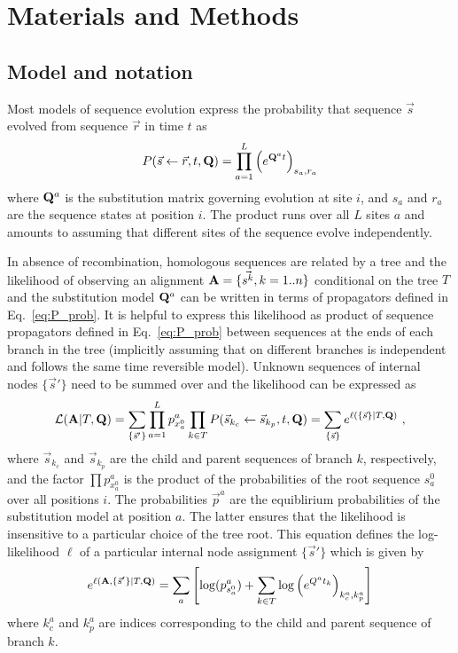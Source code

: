 \documentclass[aps,rmp,twocolumn]{revtex4}
\newcommand{\bq}{\begin{equation}}
\newcommand{\eq}{\end{equation}}
\newcommand{\mat}[1]{{\bf #1}}
\newcommand{\eqp}{p}
\newcommand{\LH}{\mathcal{L}}
\newcommand{\lh}{\ell}
\begin{document}


\onecolumngrid

\section*{Materials and Methods}
\subsection*{Model and notation}
\label{sec:MM_model}
Most models of sequence evolution express the probability that sequence $\vec{s}$ evolved from sequence $\vec{r}$ in time $t$ as
\bq
P(\vec{s}\leftarrow \vec{r},t,\mat{Q}) = \prod_{a=1}^L \left(e^{\mat{Q}^{a} t}\right)_{s_{a},r_{a}}
\label{eq:P_prob}
\eq
where $\mat{Q}^{a}$ is the substitution matrix governing evolution at site $i$, and $s_{a}$ and $r_{a}$ are the sequence states at position $i$.
The product runs over all $L$ sites $a$ and amounts to assuming that different sites of the sequence evolve independently.

In absence of recombination, homologous sequences are related by a tree and the likelihood of observing an alignment $\mat{A}=\{\vec{s^k}, k=1..n\}$ conditional on the tree $T$ and the substitution model $\mat{Q}^{a}$ can be written in terms of propagators defined in Eq.~\ref{eq:P_prob}.
It is helpful to express this likelihood as product of sequence propagators defined in Eq.~\ref{eq:P_prob} between sequences at the ends of each branch in the tree (implicitly assuming that on different branches is independent and follows the same time reversible model).
Unknown sequences of internal nodes $\{\vec{s}'\}$ need to be summed over and the likelihood can be expressed as
\begin{equation}
	\LH(\mat{A}|T,\mat{Q}) = \sum_{\{\vec{s}'\}}\prod_{a=1}^L \eqp^{a}_{x^{0}_a} \prod_{k\in T}P(\vec{s}_{k_c}\leftarrow \vec{s}_{k_p},t,\mat{Q}) = \sum_{\{\vec{s}\}} e^{\lh(\{\vec{s}\} |T, \mat{Q})}  \ ,
	\label{eq:LH}
\end{equation}
where $\vec{s}_{k_c}$ and $\vec{s}_{k_p}$ are the child and parent sequences of branch $k$, respectively, and the factor $\prod \eqp^{a}_{x^{0}_a}$ is the product of the probabilities of the root sequence $s^{0}_a$ over all positions $i$.
The probabilities $\vec{\eqp}^{a}$ are the equiblirium probabilities of the substitution model at position $a$.
The latter ensures that the likelihood is insensitive to a particular choice of the tree root.
This equation defines the log-likelihood $\lh$ of a particular internal node assignment $\{\vec{s}'\}$ which is given by
\begin{equation}
	e^{\lh(\mat{A}, \{\vec{s}'\} |T, \mat{Q})} = \sum_a \left[\log(\eqp^a_{s^{0}_a}) + \sum_{k\in T} \log\left( e^{Q^at_k} \right)_{k^a_c, k^a_p}\right]
\end{equation}
where $k^a_c$ and $k^a_p$ are indices corresponding to the child and parent sequence of branch $k$.
\end{document}

